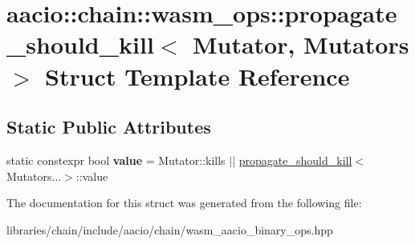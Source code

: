 \hypertarget{structaacio_1_1chain_1_1wasm__ops_1_1propagate__should__kill}{}\section{aacio\+:\+:chain\+:\+:wasm\+\_\+ops\+:\+:propagate\+\_\+should\+\_\+kill$<$ Mutator, Mutators $>$ Struct Template Reference}
\label{structaacio_1_1chain_1_1wasm__ops_1_1propagate__should__kill}
\subsection*{Static Public Attributes}
\begin{DoxyCompactItemize}
\item 
\mbox{\label{structaacio_1_1chain_1_1wasm__ops_1_1propagate__should__kill_af50626c7f3b855f4eec60c42c310e40f}} 
static constexpr bool {\bfseries value} = Mutator\+::kills $\vert$$\vert$ \mbox{\hyperlink{structaacio_1_1chain_1_1wasm__ops_1_1propagate__should__kill}{propagate\+\_\+should\+\_\+kill}}$<$Mutators...$>$\+::value
\end{DoxyCompactItemize}


The documentation for this struct was generated from the following file\+:\begin{DoxyCompactItemize}
\item 
libraries/chain/include/aacio/chain/wasm\+\_\+aacio\+\_\+binary\+\_\+ops.\+hpp\end{DoxyCompactItemize}
